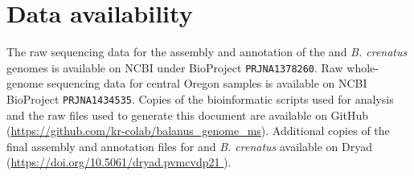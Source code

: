 \section*{Data availability}

The raw sequencing data for the assembly and annotation of the \bgla{} and \textit{B.
crenatus} genomes is available on NCBI under BioProject \texttt{PRJNA1378260}.
Raw whole-genome sequencing data for central Oregon \bgla{} samples is available on NCBI
BioProject \texttt{PRJNA1434535}.
Copies of the bioinformatic scripts used for analysis and the raw files used to generate
this document are available on GitHub
(\url{https://github.com/kr-colab/balanus_genome_ms}).
Additional copies of the final assembly and annotation files for \bgla{} and 
\textit{B. crenatus} available on Dryad (\url{https://doi.org/10.5061/dryad.pvmcvdp21 }).
